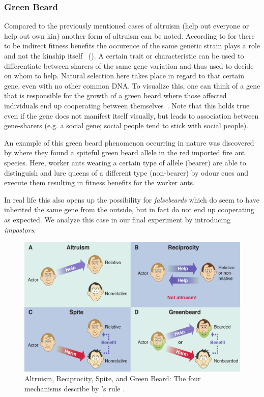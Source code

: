 \documentclass[sigconf]{acmart}
\newcommand{\impostors}{\textit{impostors}\xspace}
\begin{document}
    \subsubsection{Green Beard}
    Compared to the previously mentioned cases of altruism (help out everyone or help out own kin) another form of altruism can be noted.
    According to \citeauthor{hamiltonInnateSocialAptitudes1975} for there to be indirect fitness benefits the occurence of the same genetic strain plays a role and not the kinship itself~\cite{hamiltonInnateSocialAptitudes1975} ().
    A certain trait or characteristic can be used to differentiate between sharers of the same gene variation and thus used to decide on whom to help.
    Natural selection here takes place in regard to that certain gene, even with no other common DNA.
    To visualize this, one can think of a gene that is responsible for the growth of a green beard where those affected individuals end up cooperating between themselves~\cite{SelfishGeneRichard}.
    Note that this holds true even if the gene does not manifest itself visually, but leads to association between gene-sharers (e.g. a social gene; social people tend to stick with social people).

    An example of this green beard phenomenon occurring in nature was discovered by \citeauthor{keller_selfish_1998} \cite{keller_selfish_1998} where they found a spiteful green beard allele in the red imported fire ant species.
    Here, worker ants wearing a certain type of allele (bearer) are able to distinguish and lure queens of a different type (non-bearer) by odour cues and execute them resulting in fitness benefits for the worker ants.

    In real life this also opens up the possibility for \textit{falsebeards} which do seem to have inherited the same gene from the outside, but in fact do not end up cooperating as expected.
    We analyze this case in our final experiment by introducing \impostors.

    \begin{figure}
        \includegraphics[width=\columnwidth]{figures/mechanisms}
        \caption{Altruism, Reciprocity, Spite, and Green Beard: The four mechanisms describe by \citeauthor{hamilton_kin_1964}'s rule \cite{west_altruism_2010}.}
        \label{fig:mechanisms}
    \end{figure}
\end{document}
